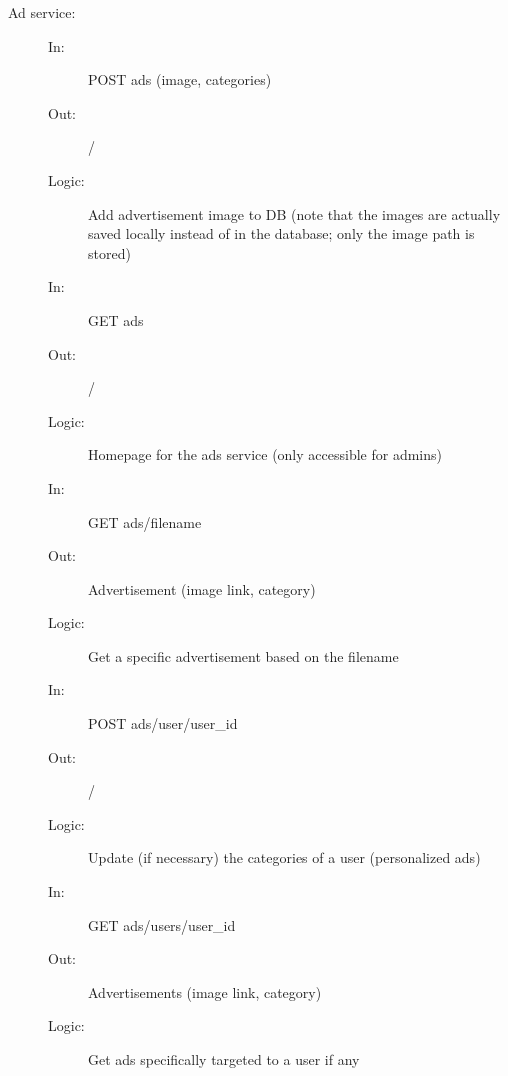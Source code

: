 \documentclass{article}
\begin{document}
\begin{description}
    \item [Ad service:]
    \begin{description}
        \item[]
        \item[In:] POST ads (image, categories)
        \item[Out:] /
        \item[Logic:] Add advertisement image to DB (note that the images are actually saved locally instead of in the database; only the image path is stored)
        \item[]
        
        \item[In:] GET ads
        \item[Out:] /
        \item[Logic:] Homepage for the ads service (only accessible for admins)
        \item[]
        
        \item[In:] GET ads/filename
        \item[Out:] Advertisement (image link, category)
        \item[Logic:] Get a specific advertisement based on the filename
        \item[]
        
        \item[In:] POST ads/user/user\_id
        \item[Out:] /
        \item[Logic:] Update (if necessary) the categories of a user (personalized ads)
        \item[]
        
        \item[In:] GET ads/users/user\_id
        \item[Out:] Advertisements (image link, category)
        \item[Logic:] Get ads specifically targeted to a user if any
    \end{description}
\end{description}
\end{document}
